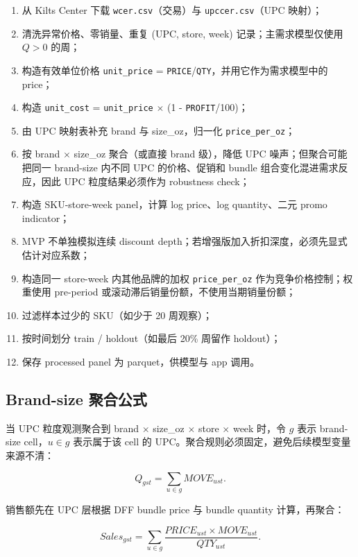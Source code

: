 \documentclass[UTF8,11pt,a4paper,fontset=none]{ctexart}
\begin{document}
\begin{enumerate}
  \item 从 Kilts Center 下载 \texttt{wcer.csv}（交易）与 \texttt{upccer.csv}（UPC 映射）；
  \item 清洗异常价格、零销量、重复 (UPC, store, week) 记录；主需求模型仅使用 $Q>0$ 的周；
  \item 构造有效单位价格 \texttt{unit\_price} = \texttt{PRICE}/\texttt{QTY}，并用它作为需求模型中的 price；
  \item 构造 \texttt{unit\_cost} = \texttt{unit\_price} $\times$ (1 - \texttt{PROFIT}/100)；
  \item 由 UPC 映射表补充 brand 与 size\_oz，归一化 \texttt{price\_per\_oz}；
  \item 按 brand $\times$ size\_oz 聚合（或直接 brand 级），降低 UPC 噪声；但聚合可能把同一 brand-size 内不同 UPC 的价格、促销和 bundle 组合变化混进需求反应，因此 UPC 粒度结果必须作为 robustness check；
  \item 构造 SKU-store-week panel，计算 log price、log quantity、二元 promo indicator；
  \item MVP 不单独模拟连续 discount depth；若增强版加入折扣深度，必须先显式估计对应系数；
  \item 构造同一 store-week 内其他品牌的加权 \texttt{price\_per\_oz} 作为竞争价格控制；权重使用 pre-period 或滚动滞后销量份额，不使用当期销量份额；
  \item 过滤样本过少的 SKU（如少于 20 周观察）；
  \item 按时间划分 train / holdout（如最后 20\% 周留作 holdout）；
  \item 保存 processed panel 为 parquet，供模型与 app 调用。
\end{enumerate}

\subsection{Brand-size 聚合公式}

当 UPC 粒度观测聚合到 brand $\times$ size\_oz $\times$ store $\times$ week 时，令 $g$ 表示 brand-size cell，$u\in g$ 表示属于该 cell 的 UPC。聚合规则必须固定，避免后续模型变量来源不清：

\begin{equation}
Q_{gst}=\sum_{u\in g} MOVE_{ust}.
\end{equation}

销售额先在 UPC 层根据 DFF bundle price 与 bundle quantity 计算，再聚合：

\begin{equation}
Sales_{gst}=\sum_{u\in g}\frac{PRICE_{ust}\times MOVE_{ust}}{QTY_{ust}}.
\end{equation}
\end{document}
